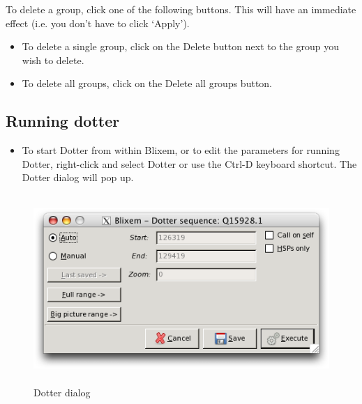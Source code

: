 \documentclass[letterpaper]{article}
\newcommand\liststyleWWviiiNumxxxvii{%
\renewcommand\labelitemi{{\textbullet}}
\renewcommand\labelitemii{o}
\renewcommand\labelitemiii{[F0A7?]}
\renewcommand\labelitemiv{[F0B7?]}
}
\begin{document}
\bigskip

To delete a group, click one of the following buttons. This will have an immediate effect (i.e. you don{\textquoteright}t have to click {\textquoteleft}Apply{\textquoteright}).

\liststyleWWviiiNumxxxvii
\begin{itemize}
\item {
To delete a single group, click on the
{\textquotesingle}Delete{\textquotesingle} button next to the group you
wish to delete.}
\item {
To delete all groups, click on the {\textquotesingle}Delete all
groups{\textquotesingle} button.}
\end{itemize}
{\color[rgb]{0.30980393,0.5058824,0.7411765}\subsection[Running dotter]{Running dotter}}
\hypertarget{RefHeading2161056909880}{}\liststyleWWviiiNumxxxvii
\begin{itemize}
\item {
To start Dotter from within Blixem, or to edit the parameters for
running Dotter, right-click and select
{\textquotesingle}Dotter{\textquotesingle} or use the Ctrl-D keyboard
shortcut. The Dotter dialog will pop up.}
\end{itemize}

\begin{figure}
\centering
\color[rgb]{0.30980393,0.5058824,0.7411765}
\includegraphics[width=13.215cm,height=7.165cm]{img_dialog_dotter.png}
\caption{Dotter dialog}
\end{figure}
\end{document}
